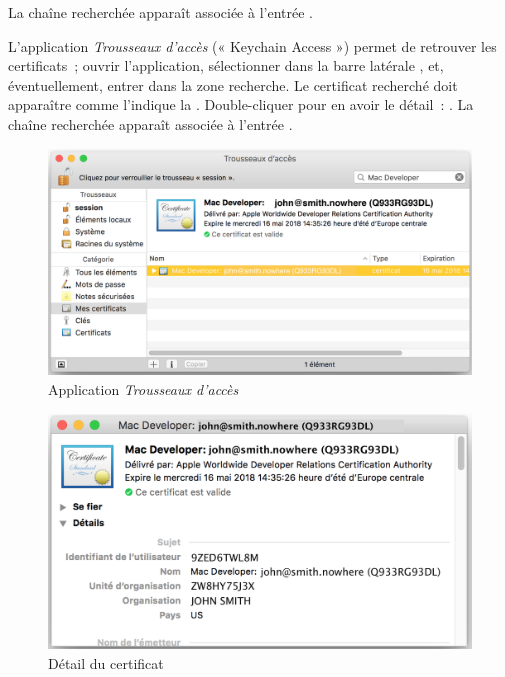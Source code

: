La chaîne recherchée apparaît associée à l'entrée .




L'application \emph{Trousseaux d'accès} (« Keychain Access ») permet de retrouver les certificats~; ouvrir l'application, sélectionner dans la barre latérale , et, éventuellement, entrer  dans la zone recherche. Le certificat recherché doit apparaître comme l'indique la . Double-cliquer pour en avoir le détail~: . La chaîne recherchée apparaît associée à l'entrée .


\begin{figure}[!t]
  \centering
  \includegraphics[width=14cm]{chapitre-cocoa-features/trousseaux-acces.png}
  \caption{Application \emph{Trousseaux d'accès}}
  \ligne
\end{figure}




\begin{figure}[!t]
  \centering
  \includegraphics[width=14cm]{chapitre-cocoa-features/certificat.png}
  \caption{Détail du certificat}
  \ligne
\end{figure}






